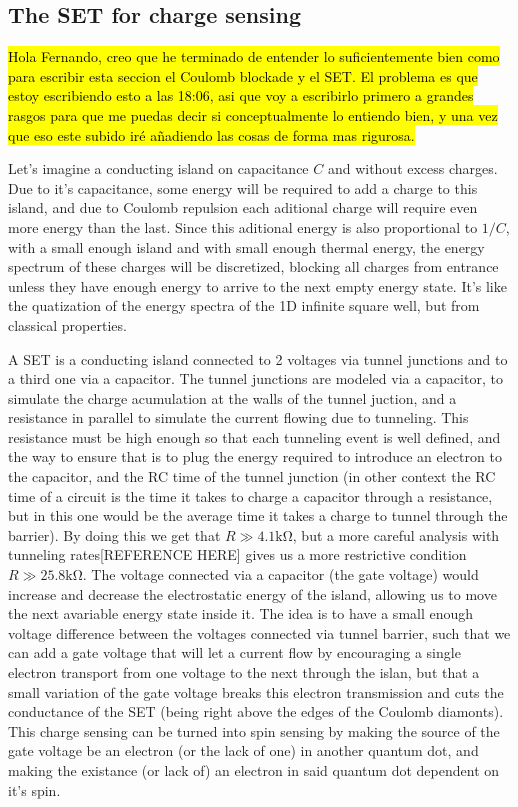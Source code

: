 \documentclass[../main.tex]{subfiles}
\begin{document}
\subsection{The SET for charge sensing}

\hl{Hola Fernando, creo que he terminado de entender lo suficientemente bien
como para escribir esta seccion el Coulomb blockade y el SET. El problema
es que estoy escribiendo esto a las 18:06, asi que voy a escribirlo primero
a grandes rasgos para que me puedas decir si conceptualmente lo entiendo bien,
y una vez que eso este subido iré añadiendo las cosas de forma mas rigurosa.}

Let's imagine a conducting island on capacitance \(C\) and without excess charges.
Due to it's capacitance, some energy will be required to add a charge to this
island, and due to Coulomb repulsion each aditional charge will require even more
energy than the last. Since this aditional energy is also proportional to
\(1/C\), with a small enough island and with small enough thermal energy,
the energy spectrum of these charges will be discretized, blocking all charges
from entrance unless they have enough energy to arrive to the next empty
energy state. It's like the quatization of the energy spectra of the 1D infinite
square well, but from classical properties.

A SET is a conducting island connected to 2 voltages via tunnel junctions
and to a third one via a capacitor. The tunnel junctions are modeled via
a capacitor, to simulate the charge acumulation at the walls of the tunnel
juction, and a resistance in parallel to simulate the current flowing due to 
tunneling. This resistance must be high enough so that each tunneling event is
well defined, and the way to ensure that is to plug the energy required to
introduce an electron to the capacitor, and the RC time of the tunnel junction
(in other context the RC time of a circuit is the time it takes to charge a
capacitor through a resistance, but in this one would be the average time
it takes a charge to tunnel through the barrier). By doing this we get
that \(R \gg 4.1\unit{\kilo\ohm}\), but a more careful analysis with
tunneling rates[REFERENCE HERE] gives us a more restrictive condition
\(R \gg 25.8\unit{\kilo\ohm}\). The voltage connected via a capacitor (the
gate voltage) would increase and decrease the electrostatic energy of the
island, allowing us to move the next avariable energy state inside it. The
idea is to have a small enough voltage difference between the voltages connected
via tunnel barrier, such that we can add a gate voltage that will let a current
flow by encouraging a single electron transport from one voltage to the next
through the islan, but that a small variation of the gate voltage breaks this
electron transmission and cuts the conductance of the SET
(being right above the edges of the Coulomb diamonts). This charge sensing
can be turned into spin sensing by making the source of the gate voltage be
an electron (or the lack of one) in another quantum dot, and making the
existance (or lack of) an electron in said quantum dot dependent on it's spin.
\end{document}
